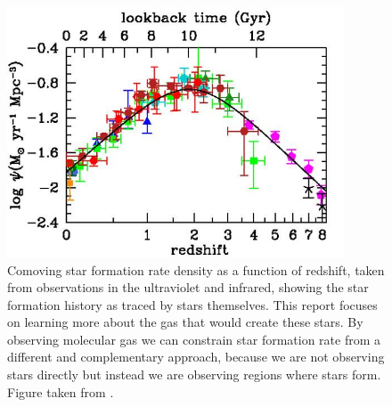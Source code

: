 \documentclass[twoside,single]{lion-msc}
\begin{document}
\begin{figure}[tbp]
\centering \includegraphics[width=100mm]{results_text/figure9a.jpg}
\caption{Comoving star formation rate density as a function of redshift, taken from observations in the ultraviolet and infrared, showing the  star formation history as traced by stars themselves. This report focuses on learning more about the gas that would create these stars. By observing molecular gas we can constrain star formation rate from a different and complementary approach, because we are not observing stars directly but instead we are observing regions where stars form. Figure taken from \cite{madau2014cosmic}.}
\label{fig:SFR_History}
\end{figure}


\end{document}
